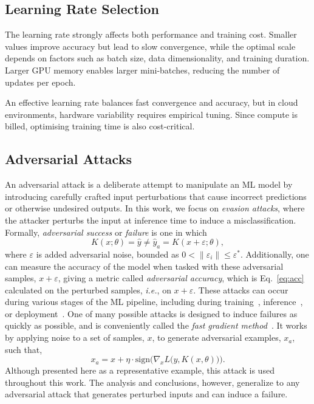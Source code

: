 \documentclass[conference]{IEEEtran}%
\begin{document}
\subsection{Learning Rate Selection}
\label{learning_rate}

The learning rate strongly affects both performance and training cost. 
Smaller values improve accuracy but lead to slow convergence, while the optimal scale depends on factors such as batch size, data dimensionality, and training duration. 
Larger GPU memory enables larger mini-batches, reducing the number of updates per epoch.

An effective learning rate balances fast convergence and accuracy, but in cloud environments, hardware variability requires empirical tuning.
Since compute is billed, optimising training time is also cost-critical.

\subsection{Adversarial Attacks}
\label{attacks}
An adversarial attack is a deliberate attempt to manipulate an ML model by introducing carefully crafted input perturbations that cause incorrect predictions or otherwise undesired outputs. 
In this work, we focus on \textit{evasion attacks}, where the attacker perturbs the input at inference time to induce a misclassification. 
Formally, \textit{adversarial success} or \textit{failure} is one in which
\begin{equation} \label{eq:adv_success}
    K(x; \theta ) = \hat{y} \neq \hat{y}_a = K(x + \varepsilon; \theta),
\end{equation}
where $\varepsilon$ is added adversarial noise,  bounded as $0 < \|\varepsilon_i\| \leq \varepsilon^*$.
Additionally, one can measure the accuracy of the model when tasked with these adversarial samples, $x + \varepsilon$, giving a metric called \textit{adversarial accuracy}, which is Eq.~\ref{eq:acc} calculated on the perturbed samples, \textit{i.e.}, on $x + \varepsilon$. 
These attacks can occur during various stages of the ML pipeline, including during training~\cite{biggio_poisoning_2013,saha2020hidden}, inference~\cite{chakraborty_adversarial_2018,orekondy2019knockoff}, or deployment~\cite{chakraborty_adversarial_2018,choquette2021label,li2021membership,carlini_towards_2017,adversarialpatch,pixelattack,hopskipjump}.
One of many possible attacks is designed to induce failures as quickly as possible, and is conveniently called the \textit{fast gradient method}~\cite{fgm}. 
It works by applying noise to a set of samples, $x$, to generate adversarial examples, $x_a$, such that,
\begin{equation}
    x_a = x + \eta \cdot \mathrm{sign}\Big(\nabla_x L\big(y, K(x, \theta)\big)\Big).
\label{eq:fgm}
\end{equation}
Although presented here as a representative example, this attack is used throughout this work. 
The analysis and conclusions, however, generalize to any adversarial attack that generates perturbed inputs and can induce a failure.
\end{document}

